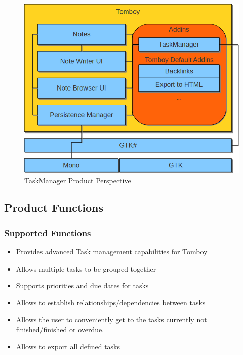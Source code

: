   \begin{figure}[ht]
    \includegraphics[width=\textwidth]{graphics/product_perspective_diagram.png}
    \caption{TaskManager Product Perspective}
    \label{perspective}
  \end{figure}


\subsection{Product Functions}
\label{description:functions}

  \subsubsection*{Supported Functions}
  \label{description:functions:supported}

    \begin{itemize}
      \item Provides advanced Task management capabilities for Tomboy
      \item Allows multiple tasks to be grouped together
      \item Supports priorities and due dates for tasks
      \item Allows to establish relationships/dependencies between tasks
      \item Allows the user to conveniently get to the tasks currently not finished/finished or overdue.
      \item Allows to export all defined tasks
    \end{itemize}

